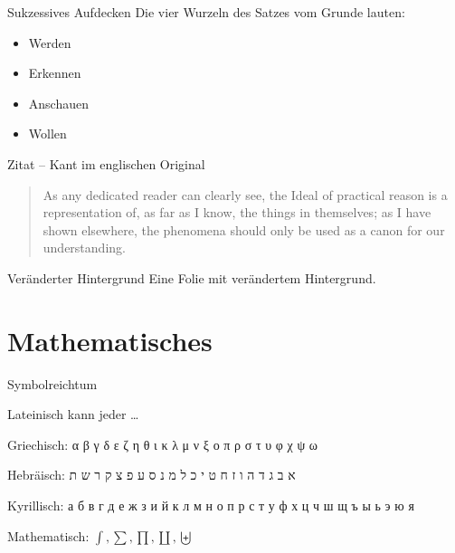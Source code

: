 \begin{frame}{Sukzessives Aufdecken}
    Die vier Wurzeln des Satzes vom Grunde lauten:
    \begin{itemize}[<+->]
        \item Werden
        \item Erkennen
        \item Anschauen
        \item Wollen
    \end{itemize}
\end{frame}

\begin{frame}{Zitat -- Kant im englischen Original}
    \begin{verse}
        As any dedicated reader can clearly see, the Ideal of practical reason is a representation of, as far as I know, the things in themselves; as I have shown elsewhere, the phenomena should only be used as a canon for our understanding.

        \hspace*{}
    \end{verse}
\end{frame}
\begingroup
{}
\begin{frame}{Veränderter Hintergrund}
    Eine Folie mit verändertem Hintergrund.
\end{frame}
\endgroup

\section{Mathematisches}

\begin{frame}{Symbolreichtum}

    Lateinisch kann jeder \ldots

    \newfontface{}
    Griechisch: {\greekfont α β γ δ ε ζ η θ ι κ λ μ ν ξ ο π ρ σ τ υ φ χ ψ ω}

    \newfontface{}
    Hebräisch: {\hebrewfont א ב ג ד ה ו ז ח ט י כ ל מ נ ס ע פ צ ק ר ש ת}

    \newfontface{}
    Kyrillisch: {\cyrillicfont а б в г д е ж з и й к л м н о п р с т у ф х ц ч ш щ ъ ы ь э ю я}

    Mathematisch: $\displaystyle{ \int, \sum, \prod, \coprod, \biguplus }$
\end{frame}

